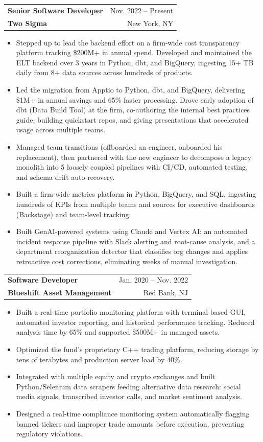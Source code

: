 \documentclass[letterpaper,11pt]{article}
\makeatletter
\newcommand{\resumeItem}[1]{
  \item\small{
    {#1 \vspace{-2pt}}
  }
}
\newcommand{\resumeSubheading}[4]{
  \vspace{-2pt}\item
    \begin{tabular*}{0.97\textwidth}[t]{l@{\extracolsep{\fill}}r}
      \textbf{\normalsize #1} & {\small #2} \\
      {\small\color{sectionblue}\textbf{#3}} & {\small #4} \\
    \end{tabular*}\vspace{-7pt}
}
\newcommand{\resumeItemListStart}{\begin{itemize}\setlength{\itemsep}{0pt}}
\newcommand{\resumeItemListEnd}{\end{itemize}\vspace{-5pt}}
\makeatother
\begin{document}
    \resumeSubheading
      {Senior Software Developer}{Nov. 2022 -- Present}
      {Two Sigma}{New York, NY}
      \resumeItemListStart
        \resumeItem{Stepped up to lead the backend effort on a firm-wide cost transparency platform tracking \$200M+ in annual spend. Developed and maintained the ELT backend over 3 years in Python, dbt, and BigQuery, ingesting 15+ TB daily from 8+ data sources across hundreds of products.}
        \resumeItem{Led the migration from Apptio to Python, dbt, and BigQuery, delivering \$1M+ in annual savings and 65\% faster processing. Drove early adoption of dbt (Data Build Tool) at the firm, co-authoring the internal best practices guide, building quickstart repos, and giving presentations that accelerated usage across multiple teams.}
        \resumeItem{Managed team transitions (offboarded an engineer, onboarded his replacement), then partnered with the new engineer to decompose a legacy monolith into 5 loosely coupled pipelines with CI/CD, automated testing, and schema drift auto-recovery.}
        \resumeItem{Built a firm-wide metrics platform in Python, BigQuery, and SQL, ingesting hundreds of KPIs from multiple teams and sources for executive dashboards (Backstage) and team-level tracking.}
        \resumeItem{Built GenAI-powered systems using Claude and Vertex AI: an automated incident response pipeline with Slack alerting and root-cause analysis, and a department reorganization detector that classifies org changes and applies retroactive cost corrections, eliminating weeks of manual investigation.}
      \resumeItemListEnd
    \vspace{1pt}

    \resumeSubheading
      {Software Developer}{Jan. 2020 -- Nov. 2022}
      {Blueshift Asset Management}{Red Bank, NJ}
      \resumeItemListStart
        \resumeItem{Built a real-time portfolio monitoring platform with terminal-based GUI, automated investor reporting, and historical performance tracking. Reduced analysis time by 65\% and supported \$500M+ in managed assets.}
        \resumeItem{Optimized the fund's proprietary C++ trading platform, reducing storage by tens of terabytes and production server load by 40\%.}
        \resumeItem{Integrated with multiple equity and crypto exchanges and built Python/Selenium data scrapers feeding alternative data research: social media signals, transcribed investor calls, and market sentiment analysis.}
        \resumeItem{Designed a real-time compliance monitoring system automatically flagging banned tickers and improper trade amounts before execution, preventing regulatory violations.}
      \resumeItemListEnd
    \vspace{1pt}
\end{document}

